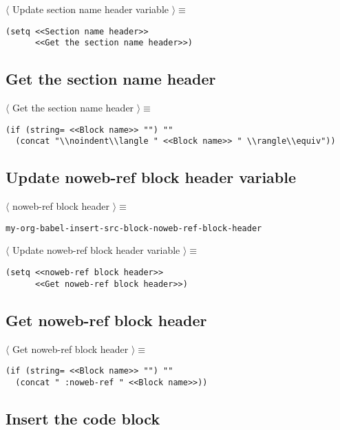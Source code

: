 \documentclass[11pt]{article}
\begin{document}
\noindent\(\langle\) Update section name header variable \(\rangle \equiv\)
\begin{verbatim}
(setq <<Section name header>>
      <<Get the section name header>>)
\end{verbatim}

\subsection{Get the section name header}
\label{sec:org36a6bd5}

\noindent\(\langle\) Get the section name header \(\rangle \equiv\)
\begin{verbatim}
(if (string= <<Block name>> "") ""
  (concat "\\noindent\\langle " <<Block name>> " \\rangle\\equiv"))
\end{verbatim}

\subsection{Update noweb-ref block header variable}
\label{sec:org3d469d2}

\noindent\(\langle\) noweb-ref block header \(\rangle \equiv\)
\begin{verbatim}
my-org-babel-insert-src-block-noweb-ref-block-header
\end{verbatim}

\noindent\(\langle\) Update noweb-ref block header variable \(\rangle \equiv\)
\begin{verbatim}
(setq <<noweb-ref block header>>
      <<Get noweb-ref block header>>)
\end{verbatim}

\subsection{Get noweb-ref block header}
\label{sec:org5866351}

\noindent\(\langle\) Get noweb-ref block header \(\rangle \equiv\)
\begin{verbatim}
(if (string= <<Block name>> "") ""
  (concat " :noweb-ref " <<Block name>>))
\end{verbatim}

\subsection{Insert the code block}
\label{sec:org75642ab}
\end{document}

